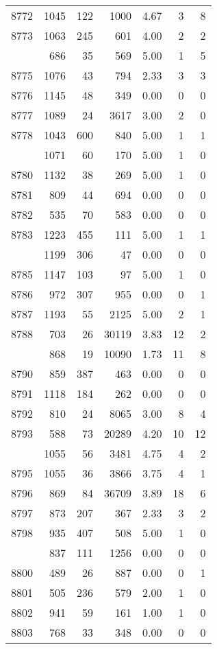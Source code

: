 \documentclass[
]{article}
\begin{document}
\begin{table}
\begin{tabular}[t]{lrrrrrr}
8772 & 1045 & 122 & 1000 & 4.67 & 3 & 8\\
8773 & 1063 & 245 & 601 & 4.00 & 2 & 2\\
\addlinespace
8774 & 686 & 35 & 569 & 5.00 & 1 & 5\\
8775 & 1076 & 43 & 794 & 2.33 & 3 & 3\\
8776 & 1145 & 48 & 349 & 0.00 & 0 & 0\\
8777 & 1089 & 24 & 3617 & 3.00 & 2 & 0\\
8778 & 1043 & 600 & 840 & 5.00 & 1 & 1\\
\addlinespace
8779 & 1071 & 60 & 170 & 5.00 & 1 & 0\\
8780 & 1132 & 38 & 269 & 5.00 & 1 & 0\\
8781 & 809 & 44 & 694 & 0.00 & 0 & 0\\
8782 & 535 & 70 & 583 & 0.00 & 0 & 0\\
8783 & 1223 & 455 & 111 & 5.00 & 1 & 1\\
\addlinespace
8784 & 1199 & 306 & 47 & 0.00 & 0 & 0\\
8785 & 1147 & 103 & 97 & 5.00 & 1 & 0\\
8786 & 972 & 307 & 955 & 0.00 & 0 & 1\\
8787 & 1193 & 55 & 2125 & 5.00 & 2 & 1\\
8788 & 703 & 26 & 30119 & 3.83 & 12 & 2\\
\addlinespace
8789 & 868 & 19 & 10090 & 1.73 & 11 & 8\\
8790 & 859 & 387 & 463 & 0.00 & 0 & 0\\
8791 & 1118 & 184 & 262 & 0.00 & 0 & 0\\
8792 & 810 & 24 & 8065 & 3.00 & 8 & 4\\
8793 & 588 & 73 & 20289 & 4.20 & 10 & 12\\
\addlinespace
8794 & 1055 & 56 & 3481 & 4.75 & 4 & 2\\
8795 & 1055 & 36 & 3866 & 3.75 & 4 & 1\\
8796 & 869 & 84 & 36709 & 3.89 & 18 & 6\\
8797 & 873 & 207 & 367 & 2.33 & 3 & 2\\
8798 & 935 & 407 & 508 & 5.00 & 1 & 0\\
\addlinespace
8799 & 837 & 111 & 1256 & 0.00 & 0 & 0\\
8800 & 489 & 26 & 887 & 0.00 & 0 & 1\\
8801 & 505 & 236 & 579 & 2.00 & 1 & 0\\
8802 & 941 & 59 & 161 & 1.00 & 1 & 0\\
8803 & 768 & 33 & 348 & 0.00 & 0 & 0\\

\end{tabular}
\end{table}
\end{document}
